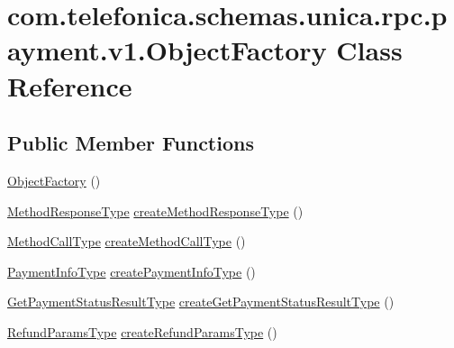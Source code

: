 \hypertarget{classcom_1_1telefonica_1_1schemas_1_1unica_1_1rpc_1_1payment_1_1v1_1_1ObjectFactory}{
\section{com.telefonica.schemas.unica.rpc.payment.v1.ObjectFactory Class Reference}
\label{classcom_1_1telefonica_1_1schemas_1_1unica_1_1rpc_1_1payment_1_1v1_1_1ObjectFactory}
}
\subsection*{Public Member Functions}
\begin{DoxyCompactItemize}
\item 
\hyperlink{classcom_1_1telefonica_1_1schemas_1_1unica_1_1rpc_1_1payment_1_1v1_1_1ObjectFactory_a3ffac1df2198d209791aada5f5766ad5}{ObjectFactory} ()
\item 
\hyperlink{classcom_1_1telefonica_1_1schemas_1_1unica_1_1rpc_1_1payment_1_1v1_1_1MethodResponseType}{MethodResponseType} \hyperlink{classcom_1_1telefonica_1_1schemas_1_1unica_1_1rpc_1_1payment_1_1v1_1_1ObjectFactory_a85dcf83efc8d6d3f15543332076a2b7c}{createMethodResponseType} ()
\item 
\hyperlink{classcom_1_1telefonica_1_1schemas_1_1unica_1_1rpc_1_1payment_1_1v1_1_1MethodCallType}{MethodCallType} \hyperlink{classcom_1_1telefonica_1_1schemas_1_1unica_1_1rpc_1_1payment_1_1v1_1_1ObjectFactory_acb172bb430b8a96f8c7d48787ac84eec}{createMethodCallType} ()
\item 
\hyperlink{classcom_1_1telefonica_1_1schemas_1_1unica_1_1rpc_1_1payment_1_1v1_1_1PaymentInfoType}{PaymentInfoType} \hyperlink{classcom_1_1telefonica_1_1schemas_1_1unica_1_1rpc_1_1payment_1_1v1_1_1ObjectFactory_a0bbee7e1470ebabb8d5ab18416a3d01d}{createPaymentInfoType} ()
\item 
\hyperlink{classcom_1_1telefonica_1_1schemas_1_1unica_1_1rpc_1_1payment_1_1v1_1_1GetPaymentStatusResultType}{GetPaymentStatusResultType} \hyperlink{classcom_1_1telefonica_1_1schemas_1_1unica_1_1rpc_1_1payment_1_1v1_1_1ObjectFactory_a1bcc0b0786fefc125cebcf31a5732a27}{createGetPaymentStatusResultType} ()
\item 
\hyperlink{classcom_1_1telefonica_1_1schemas_1_1unica_1_1rpc_1_1payment_1_1v1_1_1RefundParamsType}{RefundParamsType} \hyperlink{classcom_1_1telefonica_1_1schemas_1_1unica_1_1rpc_1_1payment_1_1v1_1_1ObjectFactory_a337fa6bfb766797f90f5d5ec4f66f9b9}{createRefundParamsType} ()

\end{DoxyCompactItemize}
